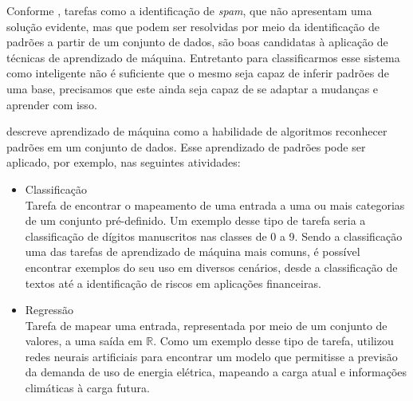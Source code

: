 \documentclass[
    12pt,
    oneside,
    a4paper,
    english,
    brazil
]{abntex2}
\begin{document}
Conforme , tarefas como a identificação de \textit{spam}, que não apresentam uma solução evidente, mas que podem ser resolvidas por meio da identificação de padrões a partir de um conjunto de  dados, são boas candidatas à aplicação de técnicas de aprendizado de máquina.%
Entretanto para classificarmos esse sistema como inteligente não é suficiente que o mesmo seja capaz de inferir padrões de uma base, precisamos que este ainda seja capaz de se adaptar a mudanças e aprender com isso.

 descreve aprendizado de máquina como a habilidade  de algoritmos reconhecer padrões em um conjunto de dados. 
Esse aprendizado de padrões pode ser aplicado, por exemplo, nas seguintes atividades:
\begin{itemize}
    \item Classificação\\
        Tarefa de encontrar  o  mapeamento  de  uma   entrada  a  uma  ou mais categorias de um conjunto pré-definido.
        Um exemplo desse tipo de tarefa seria a classificação de dígitos manuscritos nas classes de 0 a 9. Sendo a classificação uma das tarefas de aprendizado de máquina mais comuns, é possível encontrar  exemplos do seu uso em diversos cenários, desde a classificação de textos até a identificação de riscos em aplicações financeiras.
    \item Regressão\\
        Tarefa de mapear uma entrada, representada por meio de um conjunto  de valores, a uma saída em  $\mathbb{R}$. 
        Como um exemplo desse tipo de tarefa,  utilizou redes  neurais   artificiais para encontrar um modelo que permitisse a previsão da  demanda de  uso de energia elétrica,  mapeando a carga atual e informações climáticas à carga futura.
\end{itemize}
\end{document}
